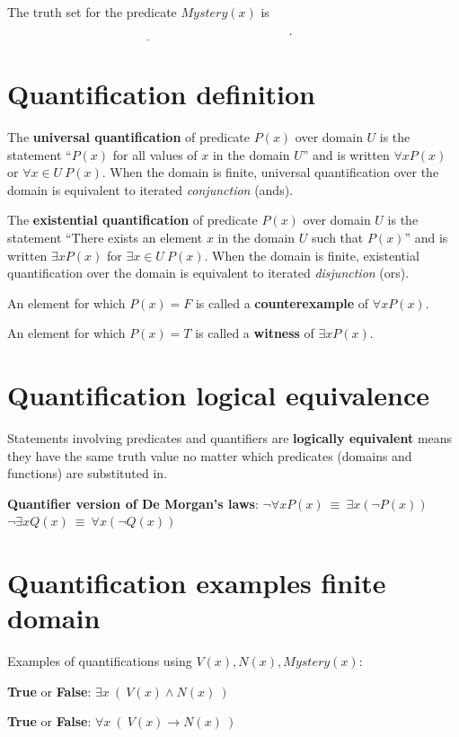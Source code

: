 \documentclass[12pt, oneside]{article}
\begin{document}
The truth set for the predicate $Mystery(x)$ is $\underline{\phantom{\{ x ~\mid~ Mystery(x) = T\} = \{ 000, 001, 010, 101, 111 \}}}$.


\vfill \vfill
\section*{Quantification definition}


The {\bf universal quantification} of predicate $P(x)$ over
domain $U$ is the statement ``$P(x)$ for all values of $x$ in the domain $U$''
and is written $\forall x P(x)$ or $\forall x \in U ~P(x)$. 
When the domain is finite, universal quantification over the domain 
is equivalent to iterated {\it conjunction} (ands).

The {\bf existential quantification} of predicate $P(x)$ 
over domain $U$ is the statement ``There exists an element $x$ 
in the domain $U$ such that $P(x)$'' and is written $\exists x P(x)$
for $\exists x \in U ~P(x)$. 
When the domain is finite, existential quantification over the domain 
is equivalent to iterated {\it disjunction} (ors).

An element for which $P(x) = F$ is called a {\bf counterexample} of $\forall x P(x)$.

An element for which $P(x) = T$ is called a {\bf witness} of $\exists x P(x)$.
 \vfill
\section*{Quantification logical equivalence}


Statements involving predicates and quantifiers are {\bf logically equivalent} 
means they have the same truth value no matter which predicates (domains and functions) 
are substituted in. 

{\bf Quantifier version of De Morgan's laws}: 
$\boxed{\neg \forall x P(x) ~\equiv~ \exists x \left( \neg P(x) \right)}$
\qquad
\qquad
$\boxed{\neg \exists x Q(x) ~\equiv~ \forall x \left( \neg Q(x) \right)}$
 \vfill
\section*{Quantification examples finite domain}


Examples of quantifications using $V(x), N(x), Mystery(x)$:

{\bf True} or {\bf False}: $\exists x~ (~V(x) \land N(x)~)$

{\bf True} or {\bf False}: $\forall x~ (~V(x) \to N(x)~)$
\end{document}
